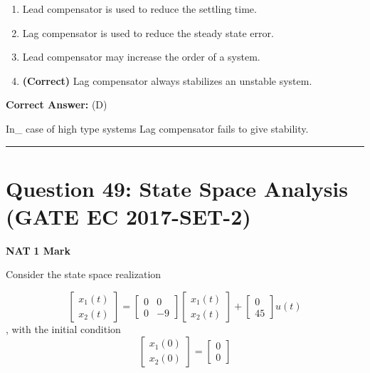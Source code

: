 \documentclass[11pt,a4paper]{article}
\begin{document}
\begin{enumerate}[label=(\Alph*)]
    \item Lead compensator is used to reduce the settling time.
    \item Lag compensator is used to reduce the steady state error.
    \item Lead compensator may increase the order of a system.
    \item \textbf{(Correct)} Lag compensator always stabilizes an unstable system.
\end{enumerate}

\noindent \textbf{Correct Answer:} (D)

\begin{tcolorbox}[solbox, title=Detailed Solution -- Question 48]
In\_ case of high type systems Lag compensator
fails to give stability.
\end{tcolorbox}

\vspace{1.5em}
\hrule
\vspace{1.5em}

\section*{Question 49: State Space Analysis (GATE EC 2017-SET-2)}
\noindent \textbf{\color{primary}NAT} \hfill \textbf{\color{secondary}1 Mark}


\noindent Consider the state space realization 
 
\[
\begin{bmatrix} x_{1}(t)\\ x_{2}(t) \end{bmatrix}=\begin{bmatrix} 0 & 0\\ 0&-9 \end{bmatrix} \begin{bmatrix} x_{1}(t)\\ x_{2}(t) \end{bmatrix}+ \begin{bmatrix} 0\\ 45 \end{bmatrix}u(t)
\]
 , with the initial condition 
\[
\begin{bmatrix} x_{1}(0)\\ x_{2}(0) \end{bmatrix}=\begin{bmatrix} 0\\ 0 \end{bmatrix}
\]
  
\end{document}
